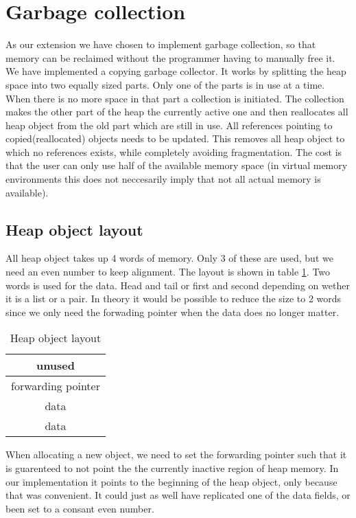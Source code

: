 \documentclass{scrartcl}
\begin{document}
\section{Garbage collection}

As our extension we have chosen to implement garbage collection, so that
memory can be reclaimed without the programmer having to manually free
it. We have implemented a copying garbage collector. It works by splitting 
the heap space into two equally sized parts. Only one of the parts is 
in use at a time. When there is no more space in that part a collection
is initiated. The collection makes the other part of the heap the 
currently active one and then reallocates all heap object from the old
part which are still in use. All references pointing to copied(reallocated)
objects needs to be updated. This removes all heap object to which no
references exists, while completely avoiding fragmentation. The cost is
that the user can only use half of the available memory space (in
virtual memory environments this does not neccesarily imply that not
all actual memory is available).

\subsection{Heap object layout}

All heap object takes up 4 words of memory. Only 3 of these are used,
but we need an even number to keep alignment. The layout is shown
in table \ref{tab:heapobj}. Two words is used for the data. Head and 
tail or first and second depending on wether it is a list or a 
pair. In theory it would be
possible to reduce the size to 2 words since we only need the forwading
pointer when the data does no longer matter.

\begin{table}
\centering
\begin{tabular}{| c |}
\hline
unused \\
\hline
forwarding pointer \\
\hline
data \\
\hline
data \\
\hline
\end{tabular}
\caption{Heap object layout}
\label{tab:heapobj}
\end{table}

When allocating a new object, we need to set the forwarding pointer
such that it is guarenteed to not point the the currently inactive
region of heap memory. In our implementation it points to the beginning
of the heap object, only because that was convenient. It could just
as well have replicated one of the data fields, or been set to a consant
even number.
\end{document}
